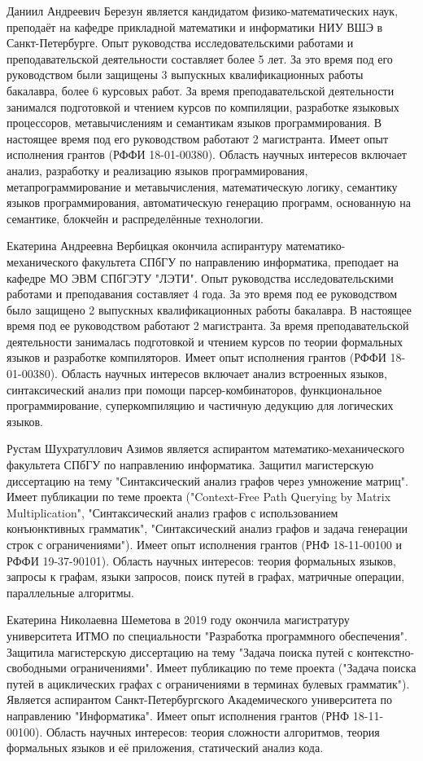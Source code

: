 \documentclass[12pt]{article}  %
\theoremstyle{remark}
\begin{document}
Даниил Андреевич Березун является кандидатом физико-математических наук, преподаёт на кафедре прикладной математики и информатики НИУ ВШЭ в Санкт-Петербурге. Опыт руководства исследовательскими работами и преподавательской деятельности составляет более 5 лет. За это время под его руководством были защищены 3 выпускных квалификационных работы бакалавра, более 6 курсовых работ. За время преподавательской деятельности занимался подготовкой и чтением курсов по компиляции, разработке языковых процессоров, метавычислениям и семантикам языков программирования. В настоящее время под его руководством работают 2 магистранта. Имеет опыт исполнения грантов (РФФИ 18-01-00380). Область научных интересов включает анализ, разработку и реализацию языков программирования,  метапрограммирование и метавычисления, математическую логику, семантику языков программирования, автоматическую генерацию программ, основанную на семантике, блокчейн и распределённые технологии.

Екатерина Андреевна Вербицкая окончила аспирантуру математико-механического факультета СПбГУ по направлению информатика, преподает на кафедре МО ЭВМ СПбГЭТУ "ЛЭТИ". Опыт руководства исследовательскими работами и преподавания составляет 4 года. За это время под ее руководством было защищено 2 выпускных квалификационных работы бакалавра. В настоящее время под ее руководством работают 2 магистранта. За время преподавательской деятельности занималась подготовкой и чтением курсов по теории формальных языков и разработке компиляторов. Имеет опыт исполнения грантов (РФФИ 18-01-00380). Область научных интересов включает анализ встроенных языков, синтаксический анализ при помощи парсер-комбинаторов, функциональное программирование, суперкомпиляцию и частичную дедукцию для логических языков.

Рустам Шухратуллович Азимов является аспирантом математико-механического факультета СПбГУ по направлению информатика. Защитил магистерскую диссертацию на тему "Синтаксический анализ графов через умножение матриц". Имеет публикации по теме проекта ("Context-Free Path Querying by Matrix Multiplication", "Синтаксический анализ графов с использованием конъюнктивных грамматик", "Синтаксический анализ графов и задача генерации строк с ограничениями"). Имеет опыт исполнения грантов (РНФ 18-11-00100 и РФФИ 19-37-90101). Область научных интересов: теория формальных языков, запросы к графам, языки запросов, поиск путей в графах, матричные операции, параллельные алгоритмы.

Екатерина Николаевна Шеметова в 2019 году окончила магистратуру университета ИТМО по специальности "Разработка программного обеспечения". Защитила магистерскую диссертацию на тему "Задача поиска путей с контекстно-свободными ограничениями". Имеет публикацию по теме проекта ("Задача поиска путей в ациклических графах с ограничениями в терминах булевых грамматик"). Является аспирантом Санкт-Петербургского Академического университета по направлению "Информатика". Имеет опыт исполнения грантов (РНФ 18-11-00100). Область научных интересов: теория сложности алгоритмов, теория формальных языков и её приложения, статический анализ кода.
\end{document}

